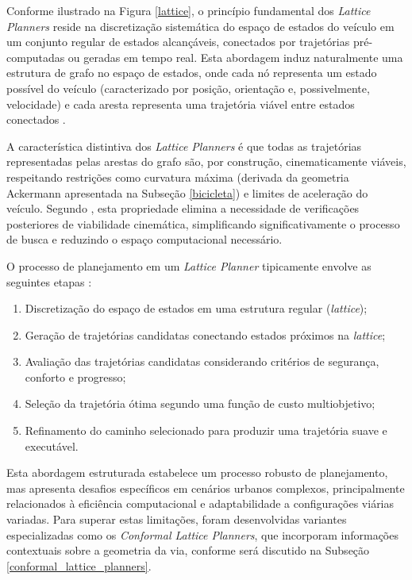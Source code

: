 Conforme ilustrado na Figura \ref{lattice}, o princípio fundamental dos \textit{Lattice Planners} reside na discretização sistemática do espaço de estados do veículo em um conjunto regular de estados alcançáveis, conectados por trajetórias pré-computadas ou geradas em tempo real. Esta abordagem induz naturalmente uma estrutura de grafo no espaço de estados, onde cada nó representa um estado possível do veículo (caracterizado por posição, orientação e, possivelmente, velocidade) e cada aresta representa uma trajetória viável entre estados conectados \cite{pivtoraiko2009differentially}.

A característica distintiva dos \textit{Lattice Planners} é que todas as trajetórias representadas pelas arestas do grafo são, por construção, cinematicamente viáveis, respeitando restrições como curvatura máxima (derivada da geometria Ackermann apresentada na Subseção \ref{bicicleta}) e limites de aceleração do veículo. Segundo , esta propriedade elimina a necessidade de verificações posteriores de viabilidade cinemática, simplificando significativamente o processo de busca e reduzindo o espaço computacional necessário.

O processo de planejamento em um \textit{Lattice Planner} tipicamente envolve as seguintes etapas \cite{University_of_Toronto2018-mp}:

\begin{enumerate}
    \item Discretização do espaço de estados em uma estrutura regular (\textit{lattice});
    \item Geração de trajetórias candidatas conectando estados próximos na \textit{lattice};
    \item Avaliação das trajetórias candidatas considerando critérios de segurança, conforto e progresso;
    \item Seleção da trajetória ótima segundo uma função de custo multiobjetivo;
    \item Refinamento do caminho selecionado para produzir uma trajetória suave e executável.
\end{enumerate}

Esta abordagem estruturada estabelece um processo robusto de planejamento, mas apresenta desafios específicos em cenários urbanos complexos, principalmente relacionados à eficiência computacional e adaptabilidade a configurações viárias variadas. Para superar estas limitações, foram desenvolvidas variantes especializadas como os \textit{Conformal Lattice Planners}, que incorporam informações contextuais sobre a geometria da via, conforme será discutido na Subseção \ref{conformal_lattice_planners}.

